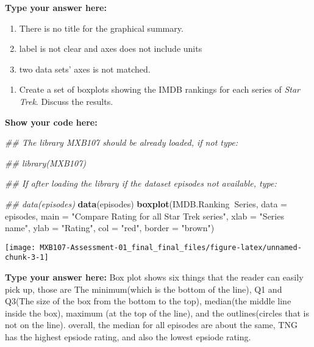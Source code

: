\documentclass[
]{article}
\newenvironment{Shaded}{\begin{snugshade}}{\end{snugshade}}
\newcommand{\CommentTok}[1]{\textcolor[rgb]{0.56,0.35,0.01}{\textit{#1}}}
\newcommand{\DataTypeTok}[1]{\textcolor[rgb]{0.13,0.29,0.53}{#1}}
\newcommand{\KeywordTok}[1]{\textcolor[rgb]{0.13,0.29,0.53}{\textbf{#1}}}
\newcommand{\NormalTok}[1]{#1}
\newcommand{\OperatorTok}[1]{\textcolor[rgb]{0.81,0.36,0.00}{\textbf{#1}}}
\newcommand{\StringTok}[1]{\textcolor[rgb]{0.31,0.60,0.02}{#1}}
\providecommand{\tightlist}{%
  \setlength{\itemsep}{0pt}\setlength{\parskip}{0pt}}
\begin{document}
\textbf{Type your answer here:}\\

\begin{enumerate}
\def\labelenumi{\arabic{enumi}.}
\tightlist
\item
  There is no title for the graphical summary.\\
\item
  label is not clear and axes does not include units
\item
  two data sets' axes is not matched.
\end{enumerate}

\begin{enumerate}
\def\labelenumi{\alph{enumi}.}
\setcounter{enumi}{2}
\tightlist
\item
  Create a set of boxplots showing the IMDB rankings for each series of
  \emph{Star Trek}. Discuss the results.
\end{enumerate}

\textbf{Show your code here:}

\begin{Shaded}
\begin{Highlighting}[]
\CommentTok{##  The library MXB107 should be already loaded, if not type:}

\CommentTok{##  library(MXB107)}

\CommentTok{##  If after loading the library if the dataset episodes not available, type:}

\CommentTok{##  data(episodes)}
\KeywordTok{data}\NormalTok{(episodes)}
\KeywordTok{boxplot}\NormalTok{(IMDB.Ranking}\OperatorTok{~}\NormalTok{Series, }\DataTypeTok{data =}\NormalTok{ episodes, }\DataTypeTok{main =} \StringTok{"Compare Rating for all Star Trek series"}\NormalTok{,}
        \DataTypeTok{xlab =} \StringTok{"Series name"}\NormalTok{, }\DataTypeTok{ylab =} \StringTok{"Rating"}\NormalTok{, }\DataTypeTok{col =} \StringTok{"red"}\NormalTok{, }\DataTypeTok{border =} \StringTok{"brown"}\NormalTok{)}
\end{Highlighting}
\end{Shaded}

\begin{center}\texttt{[image: MXB107-Assessment-01\_final\_final\_files/figure-latex/unnamed-chunk-3-1]} \end{center}

\textbf{Type your answer here:} Box plot shows six things that the
reader can easily pick up, those are The minimum(which is the bottom of
the line), Q1 and Q3(The size of the box from the bottom to the top),
median(the middle line inside the box), maximum (at the top of the
line), and the outlines(circles that is not on the line). overall, the
median for all episodes are about the same, TNG has the highest epsiode
rating, and also the lowest epsiode rating.
\end{document}
